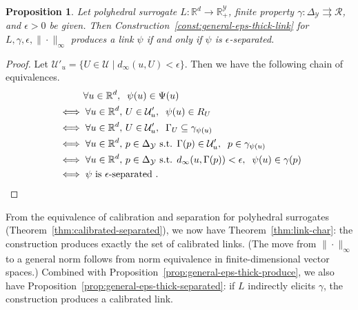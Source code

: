 \documentclass[11pt]{article}
\newcommand{\reals}{\mathbb{R}}
\newcommand{\simplex}{\Delta_\Y}
\newcommand{\R}{\mathcal{R}}
\newcommand{\U}{\mathcal{U}}
\newcommand{\Y}{\mathcal{Y}}
\newcommand{\toto}{\rightrightarrows}
\newtheorem{proposition}{Proposition}
\begin{document}
\begin{proposition}\label{prop:link-converse}
  Let polyhedral surrogate $L:\reals^d \to \reals^\Y_+$, finite property $\gamma:\simplex\toto\R$, and $\epsilon>0$ be given.
  Then Construction~\ref{const:general-eps-thick-link} for $L,\gamma,\epsilon,\|\cdot\|_\infty$ produces a link $\psi$ if and only if $\psi$ is $\epsilon$-separated.
\end{proposition}
\begin{proof}
  Let $\U'_u = \{U\in\U \mid d_{\infty}(u,U) < \epsilon\}$.
  Then we have the following chain of equivalences.  
  \begin{align*}
    &\phantom{\iff}~\forall u\in\reals^d,\;\; \psi(u)\in\Psi(u)
    \\
    &\iff \forall u\in\reals^d,\, U\in\U'_u,\;\; \psi(u)\in R_U
    \\
    &\iff \forall u\in\reals^d,\, U\in\U'_u,\;\; \Gamma_U \subseteq \gamma_{\psi(u)}
    \\
    &\iff \forall u\in\reals^d,\, p\in\simplex \text{ s.t. } \Gamma(p)\in\U'_u,\;\; p \in \gamma_{\psi(u)}
    \\
    &\iff \forall u\in\reals^d,\, p\in\simplex \text{ s.t. } d_\infty(u,\Gamma(p)) < \epsilon,\;\; \psi(u) \in \gamma(p)
    \\
    &\iff \text{$\psi$ is $\epsilon$-separated}~.
      \qedhere
  \end{align*}
\end{proof}

From the equivalence of calibration and separation for polyhedral surrogates (Theorem~\ref{thm:calibrated-separated}), we now have Theorem~\ref{thm:link-char}: the construction produces exactly the set of calibrated links.
(The move from $\|\cdot\|_\infty$ to a general norm follows from norm equivalence in finite-dimensional vector spaces.)
Combined with Proposition~\ref{prop:general-eps-thick-produce}, we also have Proposition~\ref{prop:general-eps-thick-separated}: if $L$ indirectly elicits $\gamma$, the construction produces a calibrated link.
\end{document}
